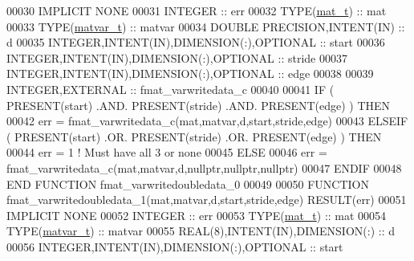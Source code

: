 \begin{DoxyCode}
00030 \textcolor{keywordtype}{IMPLICIT NONE}
00031     \textcolor{keywordtype}{INTEGER}                                  :: err
00032     \textcolor{keywordtype}{TYPE}(\hyperlink{group___m_a_t_gab0fc888f5a5d79943b16284b1f91c2e8}{mat\_t})                              :: mat
00033     \textcolor{keywordtype}{TYPE}(\hyperlink{group___m_a_t_structmatvar__t}{matvar\_t})                           :: matvar
00034     \textcolor{keywordtype}{DOUBLE PRECISION},\textcolor{keywordtype}{INTENT(IN)}              :: d
00035     \textcolor{keywordtype}{INTEGER},\textcolor{keywordtype}{INTENT(IN)},\textcolor{keywordtype}{DIMENSION(:)},\textcolor{keywordtype}{OPTIONAL} :: start
00036     \textcolor{keywordtype}{INTEGER},\textcolor{keywordtype}{INTENT(IN)},\textcolor{keywordtype}{DIMENSION(:)},\textcolor{keywordtype}{OPTIONAL} :: stride
00037     \textcolor{keywordtype}{INTEGER},\textcolor{keywordtype}{INTENT(IN)},\textcolor{keywordtype}{DIMENSION(:)},\textcolor{keywordtype}{OPTIONAL} :: edge
00038 
00039     \textcolor{keywordtype}{INTEGER},\textcolor{keywordtype}{EXTERNAL}                         :: fmat\_varwritedata\_c
00040 
00041     \textcolor{keywordflow}{IF} ( \textcolor{keyword}{PRESENT}(start) .AND. \textcolor{keyword}{PRESENT}(stride) .AND. \textcolor{keyword}{PRESENT}(edge) ) \textcolor{keywordflow}{THEN}
00042         err = fmat\_varwritedata\_c(mat,matvar,d,start,stride,edge)
00043     \textcolor{keywordflow}{ELSEIF} ( \textcolor{keyword}{PRESENT}(start) .OR. \textcolor{keyword}{PRESENT}(stride) .OR. \textcolor{keyword}{PRESENT}(edge) ) \textcolor{keywordflow}{THEN}
00044         err = 1    \textcolor{comment}{! Must have all 3 or none}
00045     \textcolor{keywordflow}{ELSE}
00046         err = fmat\_varwritedata\_c(mat,matvar,d,nullptr,nullptr,nullptr)
00047 \textcolor{keywordflow}{    ENDIF}
00048 \textcolor{keyword}{END FUNCTION }fmat\_varwritedoubledata\_0
00049 
00050 \textcolor{keyword}{FUNCTION }fmat\_varwritedoubledata\_1(mat,matvar,d,start,stride,edge) \textcolor{keyword}{RESULT}(err)
00051 \textcolor{keywordtype}{IMPLICIT NONE}
00052     \textcolor{keywordtype}{INTEGER}                                  :: err
00053     \textcolor{keywordtype}{TYPE}(\hyperlink{group___m_a_t_gab0fc888f5a5d79943b16284b1f91c2e8}{mat\_t})                              :: mat
00054     \textcolor{keywordtype}{TYPE}(\hyperlink{group___m_a_t_structmatvar__t}{matvar\_t})                           :: matvar
00055     \textcolor{keywordtype}{REAL(8)},\textcolor{keywordtype}{INTENT(IN)},\textcolor{keywordtype}{DIMENSION(:)}          :: d
00056     \textcolor{keywordtype}{INTEGER},\textcolor{keywordtype}{INTENT(IN)},\textcolor{keywordtype}{DIMENSION(:)},\textcolor{keywordtype}{OPTIONAL} :: start

\end{DoxyCode}
